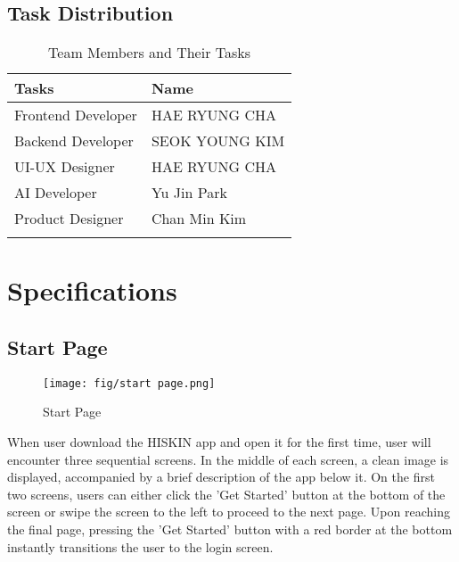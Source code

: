 \documentclass[conference]{IEEEtran}
\begin{document}
\subsection{Task Distribution}

\begin{table}[h]
\centering
\caption{Team Members and Their Tasks}
\renewcommand{\arraystretch}{1.5}
\begin{tabular}{| p{3cm}|p{3cm}|}

\hline
Tasks & Name \\

\hline
Frontend Developer & HAE RYUNG CHA\\

\hline
Backend Developer & SEOK YOUNG KIM\\

\hline
UI-UX Designer & HAE RYUNG CHA\\

\hline
AI Developer & Yu Jin Park\\

\hline
Product Designer & Chan Min Kim\\ \\

\hline
\end{tabular}
\end{table}

\section{Specifications}

\subsection{Start Page}
    \begin{figure}[h]
    \centering
    \texttt{[image: fig/start page.png]}
    \label{fig:Start Page}
    \caption{Start Page} 
    \end{figure}
When user download the HISKIN app and open it for the first time, user will encounter three sequential screens. In the middle of each screen, a clean image is displayed, accompanied by a brief description of the app below it. On the first two screens, users can either click the 'Get Started' button at the bottom of the screen or swipe the screen to the left to proceed to the next page. Upon reaching the final page, pressing the 'Get Started' button with a red border at the bottom instantly transitions the user to the login screen.\\ 
\end{document}

